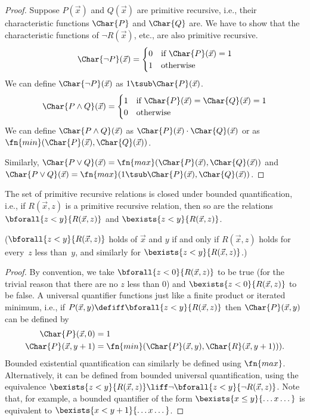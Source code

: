 \documentclass[../../../include/open-logic-section]{subfiles}
\begin{document}
\begin{proof}
  Suppose $P(\vec x)$ and $Q(\vec x)$ are primitive recursive, i.e.,
  their characteristic functions $\Char{P}$ and $\Char{Q}$ are.  We
  have to show that the characteristic functions of $\lnot R(\vec x)$,
  etc., are also primitive recursive.
  \[
  \Char{\lnot P}(\vec x) = \begin{cases}
    0 & \text{if $\Char{P}(\vec x) = 1$}\\
    1 & \text{otherwise}
  \end{cases}
  \]
  We can define $\Char{\lnot P}(\vec x)$ as $1 \tsub \Char{P}(\vec x)$.
  \[
  \Char{P \land Q}(\vec x) = \begin{cases}
    1 & \text{if $\Char{P}(\vec x) = \Char{Q}(\vec x) = 1$}\\
    0 & \text{otherwise}
  \end{cases}
  \]
  We can define $\Char{P \land Q}(\vec x)$ as $\Char{P}(\vec x) \cdot
  \Char{Q}(\vec x)$ or as $\fn{min}(\Char{P}(\vec x), \Char{Q}(\vec x))$.

  Similarly, $\Char{P \lor Q}(\vec x) = \fn{max}(\Char{P}(\vec x),
  \Char{Q}(\vec x))$ and $\Char{P \lor Q}(\vec x) = \fn{max}(1 \tsub
  \Char{P}(\vec x), \Char{Q}(\vec x))$.
\end{proof}

\begin{prop}
  The set of primitive recursive relations is closed under bounded
  quantification, i.e., if $R(\vec x, z)$ is a primitive recursive
  relation, then so are the relations $\bforall{z < y}{R(\vec x, z)}$
  and $\bexists{z < y}{R(\vec x, z)}$.

  ($\bforall{z < y}{R(\vec x, z)}$ holds of $\vec x$ and $y$ if and
  only if $R(\vec x, z)$ holds for every~$z$ less than~$y$, and
  similarly for $\bexists{z < y}{R(\vec x, z)}$.)
\end{prop}

\begin{proof}
  By convention, we take $\bforall{z < 0}{R(\vec x, z)}$ to be true
  (for the trivial reason that there are no $z$ less than $0$) and
  $\bexists{z < 0}{R(\vec x, z)}$ to be false. A universal quantifier
  functions just like a finite product or iterated minimum, i.e., if
  $P(\vec x, y) \defiff \bforall{z < y}{R(\vec x, z)}$ then
  $\Char{P}(\vec x, y)$ can be defined by
  \begin{align*}
    \Char{P}(\vec x, 0) & = 1\\
    \Char{P}(\vec x, y+1) & =
    \fn{min}(\Char{P}(\vec x, y), \Char{R}(\vec x, y+1))).
  \end{align*}
  Bounded existential quantification can similarly be defined using
  $\fn{max}$. Alternatively, it can be defined from bounded universal
  quantification, using the equivalence $\bexists{z < y}{R(\vec x, z)} \liff
  \lnot \bforall{z < y}{\lnot R(\vec x, z)}$. Note that, for example, a
  bounded quantifier of the form $\bexists{x \leq y}{\dots x\dots}$ is
  equivalent to $\bexists{x < y+1}{\dots x \dots}$.
\end{proof}
  
\end{document}
